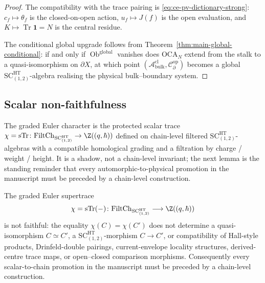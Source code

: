 \begin{proof}
The compatibility with the trace pairing is
\eqref{eq:ce-pv-dictionary-strong}: \(c_f\mapsto\theta_f\) is the
closed-on-open action, \(u_f\mapsto J(f)\) is the open evaluation, and
\(K\mapsto\operatorname{Tr}\mathbf 1=N\) is the central residue.

The conditional global upgrade follows from
Theorem~\ref{thm:main-global-conditional}: if and only if
\(\operatorname{Ob}^{\mathrm{global}}\) vanishes does
\(\mathrm{OCA}_N\) extend from the stalk to a quasi-isomorphism on
\(\partial X\), at which point
\((\mathcal A^{\mathrm{cl}}_{\mathrm{bulk}},
\mathcal C^{\mathrm{op}}_\partial)\) becomes a global
\(\mathrm{SC}^{\mathrm{HT}}_{(1,2)}\)-algebra realising the physical
bulk--boundary system.
\end{proof}

\subsection{Scalar non-faithfulness}
\label{ssec:scalar-non-faithfulness}

The graded Euler character is the protected scalar trace
\(\chi=\operatorname{sTr}\colon\mathrm{FiltCh}_{
\mathrm{SC}^{\mathrm{HT}}_{(1,2)}}\to\Z((q,\hbar))\) defined on
chain-level filtered \(\mathrm{SC}^{\mathrm{HT}}_{(1,2)}\)-algebras with
a compatible homological grading and a filtration by charge / weight /
height.  It is a shadow, not a chain-level invariant; the next lemma is
the standing reminder that every automorphic-to-physical promotion in
the manuscript must be preceded by a chain-level construction.

\begin{lem}\label{lem:scalar-non-faithfulness}
The graded Euler supertrace
\[
  \chi=\operatorname{sTr}(-)\colon
  \mathrm{FiltCh}_{\mathrm{SC}^{\mathrm{HT}}_{(1,2)}}
  \longrightarrow\Z((q,\hbar))
\]
is not faithful: the equality $\chi(C)=\chi(C')$ does not determine
a quasi-isomorphism $C\simeq C'$, a $\mathrm{SC}^{\mathrm{HT}}_{(1,2)}$-morphism
$C\to C'$, or compatibility of Hall-style products, Drinfeld-double
pairings, current-envelope locality structures, derived-centre trace
maps, or open--closed comparison morphisms.  Consequently every
scalar-to-chain promotion in the manuscript must be preceded by a
chain-level construction.
\end{lem}

